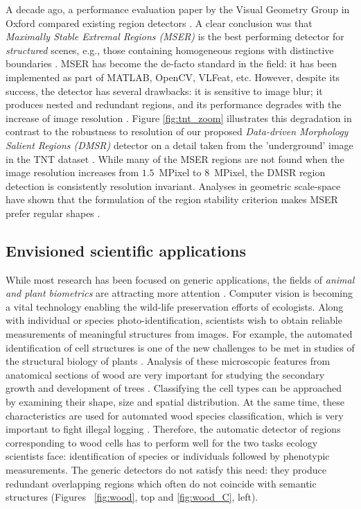 \documentclass[conference,compsoc]{IEEEtran}
\begin{document}
A decade ago, a performance evaluation paper by the Visual Geometry Group in Oxford compared existing region detectors \cite{Mikolajczyk:2005}. 
A clear conclusion was that {\em  Maximally Stable Extremal Regions (MSER)} is the best performing detector for {\em structured} scenes, e.g., those containing homogeneous regions with distinctive boundaries \cite{Matas2002BMVC}. MSER has become the de-facto standard in the field: it has been implemented as part of MATLAB, OpenCV, VLFeat, etc. However, despite its success, the detector has several drawbacks: it is sensitive to image blur; it produces nested and redundant regions, and its performance degrades with the increase of image resolution \cite{CorRos2013}. Figure \ref{fig:tnt_zoom} illustrates this degradation in contrast to the robustness to resolution of our proposed {\em Data-driven Morphology Salient Regions (DMSR)} detector on a detail taken from the 'underground' image in the TNT dataset \cite{CorRos2013}. While many of the MSER regions are not found when the image resolution increases from $1.5$~MPixel to $8$~MPixel, the DMSR region detection is consistently resolution invariant. Analyses in geometric scale-space have shown that the formulation of the region stability criterion makes MSER prefer regular shapes \cite{Kimmel11}.


\subsection{Envisioned scientific applications}
While most research has been focused on generic applications, the
 fields of {\em animal and plant biometrics} are attracting more attention \cite{Kuehl2013, leafsnap_eccv2012}. Computer vision is becoming a vital technology enabling the wild-life preservation efforts of ecologists. Along with individual or species photo-identification, scientists wish to obtain reliable measurements of meaningful structures from images. For example, the automated identification of cell structures is one of the new challenges to be met in studies of the structural biology of plants \cite{Quelhas2011}. Analysis of these microscopic features from anatomical sections of wood are very important for studying the secondary growth and development of trees \cite{Brunel2014}. Classifying the cell types can be approached by examining their shape, size and spatial distribution. At the same time, these characteristics are used for automated wood species classification, which is very important to fight illegal logging \cite{Gasson2011}. Therefore, the  automatic detector of regions corresponding to wood cells has to perform well for the two tasks ecology scientists face: identification of species or individuals followed by phenotypic measurements. The generic detectors do not satisfy this need: they produce redundant overlapping regions which often do not coincide with semantic structures (Figures ~\ref{fig:wood}, top and \ref{fig:wood_C}, left).
\end{document}
